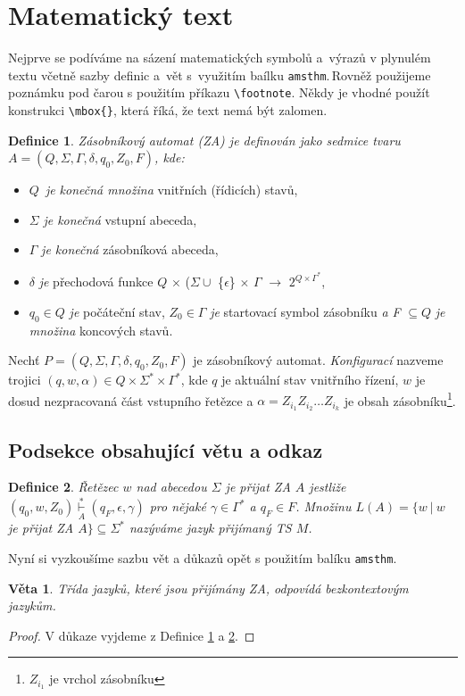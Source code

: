 \documentclass[a4paper, twocolumn, 11pt]{article}
\newtheorem{definice}{Definice}
\newtheorem{veta}{Věta}
\begin{document}
\section{Matematický text}
Nejprve se podíváme na sázení matematických symbolů a~výrazů v plynulém textu včetně sazby definic a~vět s~vy\-užitím baílku \verb=amsthm=.\,Rovněž použijeme poznámku pod čarou s použitím příkazu \verb=\footnote=. Někdy je vhodné použít konstrukci \verb=\mbox{}=, která říká, že text nemá být zalomen.
\begin{definice}\label{Def1}
\textup{Zásobníkový automat (ZA)} je definován jako sedmice tvaru $A = (Q, \Sigma, \Gamma, \delta, q_0, Z_0, F)$, kde:
\end{definice}
\begin{itemize}
    \item $Q$\ \textit{je konečná množina} vnitřních (řídicích) stavů,

    \item $\Sigma$ \textit{je konečná} vstupní abeceda,

    \item $\Gamma$ \textit{je konečná} zásobníková abeceda,

    \item $\delta$ \textit{je} přechodová funkce $Q$ $\times$ ($\Sigma \cup$ \{$\epsilon$\} $\times$ $\Gamma$ $\to$ $2^{Q \times \Gamma^\ast}$,

    \item $q_0 \in Q$ \textit{je} počáteční stav, $Z_0 \in \Gamma$ \textit{je} startovací symbol zásobníku \textit{a F} $\subseteq Q$ \textit{je množina} koncových stavů.

\end{itemize}

\indent
Nechť $P = (Q, \Sigma, \Gamma, \delta, q_0, Z_0, F)$ je zásobníkový automat. \textit{Konfigurací} nazveme trojici $(q, w, \alpha) \in Q \times \Sigma^* \times \Gamma^*$, kde $q$ je aktuální stav vnitřního řízení, $w$ je dosud nezpracovaná část vstupního řetězce a $\alpha = Z_{i_1} Z_{i_2} \ldots Z_{i_k}$ je obsah zásobníku\footnote{$Z_{i_1}$ je vrchol zásobníku}.

\subsection{Podsekce obsahující větu a odkaz}
\begin{definice}\label{Def2}
\textup{Řetězec $w$ nad abecedou $\Sigma$ je přijat ZA} $A$ jest\-liže $(q_0, w, Z_0) \underset{A}{\stackrel{\ast}{\vdash}} (q_F, \epsilon, \gamma)$ pro nějaké $\gamma \in \Gamma^\ast$ a $q_F \in F$. Množinu $L(A) = \{w\ |\ w$ je přijat ZA $A \} \subseteq \Sigma^\ast$ nazýváme \textup{jazyk přijímaný TS} $M$.
\end{definice}
\indent
Nyní si vyzkoušíme sazbu vět a důkazů opět s použitím balíku \texttt{amsthm}.
\begin{veta}Třída jazyků, které jsou přijímány ZA, odpovídá \textup{bezkontextovým jazykům.}
\end{veta}
\begin{proof} V důkaze vyjdeme z Definice \ref{Def1} a \ref{Def2}.
\end{proof}
\end{document}
